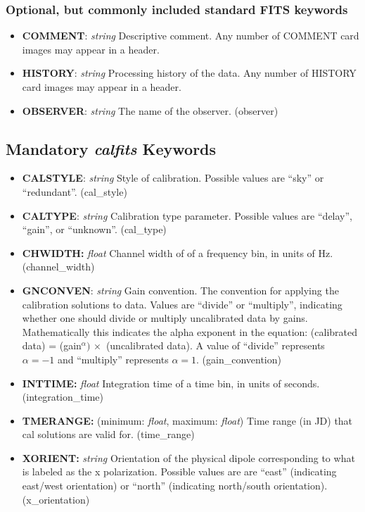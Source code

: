 \documentclass[11pt, oneside, english]{article}   	%
\begin{document}
	\subsubsection{Optional, but commonly included standard FITS keywords}
	\begin{itemize}
	\item{\textbf{COMMENT}: \emph{string} Descriptive comment. Any number of COMMENT card images may
	appear in a header.}
	\item{\textbf{HISTORY}: \emph{string} Processing history of the data. Any number of HISTORY card images may appear in a header.}
	\item{\textbf{OBSERVER}: \emph{string} The name of the observer. (observer)}
	\end{itemize}
	
	
\subsection{Mandatory \emph{calfits} Keywords}
\begin{itemize}
\item{\textbf{CALSTYLE}: \emph{string} Style of calibration. Possible values are ``sky'' or ``redundant''. (cal\_style)}
\item{\textbf{CALTYPE}: \emph{string} Calibration type parameter. Possible values are ``delay'', ``gain'', or ``unknown''. (cal\_type)}
\item{\textbf{CHWIDTH:} \emph{float} Channel width of of a frequency bin, in units of Hz. (channel\_width)}
\item{\textbf{GNCONVEN}: \emph{string} Gain convention. The convention for applying the calibration solutions to data.
Values are ``divide'' or ``multiply'', indicating whether one should divide or multiply uncalibrated data by gains. 
Mathematically this indicates the alpha exponent in the equation: 
    (calibrated data) = (gain$^{\alpha}) \,  \times $ (uncalibrated data). A value of
    ``divide'' represents $\alpha=-1$ and ``multiply'' represents $\alpha=1$. (gain\_convention)}
\item{\textbf{INTTIME:} \emph{float} Integration time of a time bin, in units of seconds. (integration\_time)}
\item{\textbf{TMERANGE:} (minimum: \emph{float}, maximum: \emph{float}) Time range (in JD) that cal solutions are valid for. (time\_range)}
\item{\textbf{XORIENT:} \emph{string} Orientation of the physical dipole corresponding to what is labeled as the x polarization. Possible values are are ``east'' (indicating east/west orientation) or ``north'' (indicating north/south orientation). (x\_orientation)}
\end{itemize}
\end{document}
